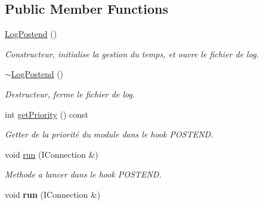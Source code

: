 \subsection*{Public Member Functions}
\begin{DoxyCompactItemize}
\item 
\hypertarget{class_log_postend_a9b9c371b5e5802f49ac0de16d0b82a4d}{}\hyperlink{class_log_postend_a9b9c371b5e5802f49ac0de16d0b82a4d}{Log\+Postend} ()\label{class_log_postend_a9b9c371b5e5802f49ac0de16d0b82a4d}

\begin{DoxyCompactList}\small\item\em Constructeur, initialise la gestion du temps, et ouvre le fichier de log. \end{DoxyCompactList}\item 
\hypertarget{class_log_postend_aea233a446b808bc924d5df607298d504}{}\hyperlink{class_log_postend_aea233a446b808bc924d5df607298d504}{$\sim$\+Log\+Postend} ()\label{class_log_postend_aea233a446b808bc924d5df607298d504}

\begin{DoxyCompactList}\small\item\em Destructeur, ferme le fichier de log. \end{DoxyCompactList}\item 
int \hyperlink{class_log_postend_ad082cc53015539843900bf0cec69f145}{get\+Priority} () const 
\begin{DoxyCompactList}\small\item\em Getter de la priorité du module dans le hook P\+O\+S\+T\+E\+N\+D. \end{DoxyCompactList}\item 
\hypertarget{class_log_postend_adcfbb7a63b3dfc28ea1efc517dd86a1d}{}void \hyperlink{class_log_postend_adcfbb7a63b3dfc28ea1efc517dd86a1d}{run} (I\+Connection \&)\label{class_log_postend_adcfbb7a63b3dfc28ea1efc517dd86a1d}

\begin{DoxyCompactList}\small\item\em Methode a lancer dans le hook P\+O\+S\+T\+E\+N\+D. \end{DoxyCompactList}\item 
\hypertarget{class_log_postend_adcfbb7a63b3dfc28ea1efc517dd86a1d}{}void {\bfseries run} (I\+Connection \&)\label{class_log_postend_adcfbb7a63b3dfc28ea1efc517dd86a1d}

\end{DoxyCompactItemize}


